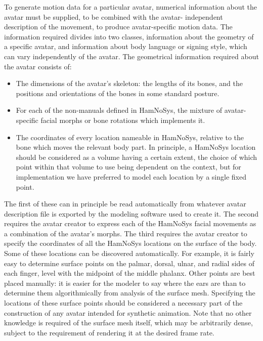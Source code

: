 To generate motion data for a particular avatar, numerical information about the avatar must be supplied, to be combined with the avatar- independent description of the movement, to produce avatar-specific motion data. The information required divides into two classes, information about the geometry of a specific avatar, and information about body language or signing style, which can vary independently of the avatar.
The geometrical information required about the avatar consists of:
\begin{itemize}
\item The dimensions of the avatar’s skeleton: the lengths of its bones, and the positions and orientations of the bones in some standard posture.
\item For each of the non-manuals defined in HamNoSys, the mixture of avatar-specific facial morphs or bone rotations which implements it.
\item The coordinates of every location nameable in HamNoSys, relative to the bone which moves the relevant body part. In principle, a HamNoSys location should be considered as a volume having a certain extent, the choice of which point within that volume to use being dependent on the context, but for implementation we have preferred to model each location by a single fixed point.
\end{itemize}

The first of these can in principle be read automatically from whatever avatar description file is exported by the modeling software used to create it. The second requires the avatar creator to express each of the HamNoSys facial movements as a combination of the avatar’s morphs. The third requires the avatar creator to specify the coordinates of all the HamNoSys locations on the surface of the body. Some of these locations can be discovered automatically. For example, it is fairly easy to determine surface points on the palmar, dorsal, ulnar, and radial sides of each finger, level with the midpoint of the middle phalanx. Other points are best placed manually: it is easier for the modeler to say where the ears are than to determine them algorithmically from analysis of the surface mesh. Specifying the locations of these surface points should be considered a necessary part of the construction of any avatar intended for synthetic animation. Note that no other knowledge is required of the surface mesh itself, which may be arbitrarily dense, subject to the requirement of rendering it at the desired frame rate.

